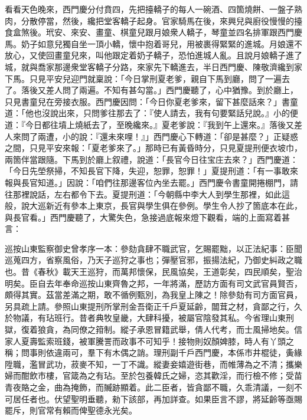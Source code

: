 看看天色晚來，西門慶分付賁四，先把擡轎子的每人一碗酒、四箇燒餅、一盤子熟肉，分散停當，然後，纔把堂客轎子起身。官家騎馬在後，來興兒與廚役慢慢的擡食盒煞後。玳安、來安、畫童、棋童兒跟月娘衆人轎子，琴童並四名排軍跟西門慶馬。奶子如意兒獨自坐一頂小轎，懷中抱着哥兒，用被裹得緊緊的進城。月娘還不放心，又使回畫童兒來，叫他跟定着奶子轎子，恐怕進城人亂。{}且說月娘轎子進了城，就與喬家那邊衆堂客轎子分路，來家先下轎進去，半日西門慶、陳敬濟纔到家下馬。只見平安兒迎門就稟說：「今日掌刑夏老爹，親自下馬到廳，問了一遍去了。落後又差人問了兩遍。不知有甚勾當。」{}西門慶聽了，心中猶豫。到於廳上，只見書童兒在旁接衣服。西門慶因問：「今日你夏老爹來，留下甚麼話來？」書童道：「他也沒說出來，只問爹往那去了：『使人請去，我有句要緊話兒說。』小的便道：『今日都往墳上燒紙去了，至晚纔來。』夏老爹說：『我到午上還來。』落後又差人來問了兩遭，小的說：『還未來哩！』」西門慶心下轉道：「卻是甚麼？」正疑惑之間，只見平安來報：「夏老爹來了。」那時已有黃昏時分，只見夏提刑便衣坡巾，兩箇伴當跟隨。下馬到於廳上叙禮，說道：「長官今日往宝庄去來？」西門慶道：「今日先塋祭掃，不知長官下降，失迎，恕罪，恕罪！」夏提刑道：「有一事敢來報與長官知道。」因說：「咱們往那邊客位內坐去罷。」西門慶令書童開捲棚門，請往那裡說話，左右都令下去。夏提刑道：「今朝縣中李大人到學生那裡，如此這般，說大巡新近有參本上東京，長官與學生俱在參例。學生令人抄了箇底本在此，與長官看。」西門慶聽了，大驚失色，急接過底報來燈下觀看，端的上面寫着甚言：

\begin{myquote}[\markfont]
巡按山東監察御史曾孝序一本：參劾貪肆不職武官，乞賜罷黜，以正法紀事：臣聞巡蒐四方，省察風俗，乃天子巡狩之事也；彈壓官邪，振揚法紀，乃御史糾政之職也。昔《春秋》載天王巡狩，而萬邦懷保，民風協矣，王道彰矣，四民順矣，聖治明矣。臣自去年奉命巡按山東齊魯之邦，一年將滿，歷訪方面有司文武官員賢否，頗得其實。茲當差滿之期，敢不循例甄別，為我皇上陳之！除參劾有司方面官員，另具疏上請。參照山東提刑所掌刑金吾衛正千戶夏延齡，闒茸之材，貪鄙之行，久於物議，有玷班行。昔者典牧皇畿，大肆科擾，被屬官陰發其私。今省理山東刑獄，復着狼貪，為同僚之箝制。縱子承恩冒籍武舉，倩人代考，而士風掃地矣。信家人夏壽監索班錢，被軍騰詈而政事不可知乎！接物則奴顏婢膝，時人有丫頭之稱；問事則依違兩可，羣下有木偶之誚。理刑副千戶西門慶，本係市井棍徒，夤緣陞職，濫冒武功，菽麥不知，一丁不識。縱妻妾嬉遊街巷，而帷薄為之不清；攜樂婦而酣飲市樓，官箴為之有玷。至於包養韓氏之婦，恣其歡淫，而行檢不修；受苗青夜賂之金，曲為掩飾，而贓跡顯着。此二臣者，皆貪鄙不職，久乖清議，一刻不可居任者也。伏望聖明垂聽，勑下該部，再加詳查。如果臣言不謬，將延齡等亟賜罷斥，則官常有賴而俾聖德永光矣。
\end{myquote}


